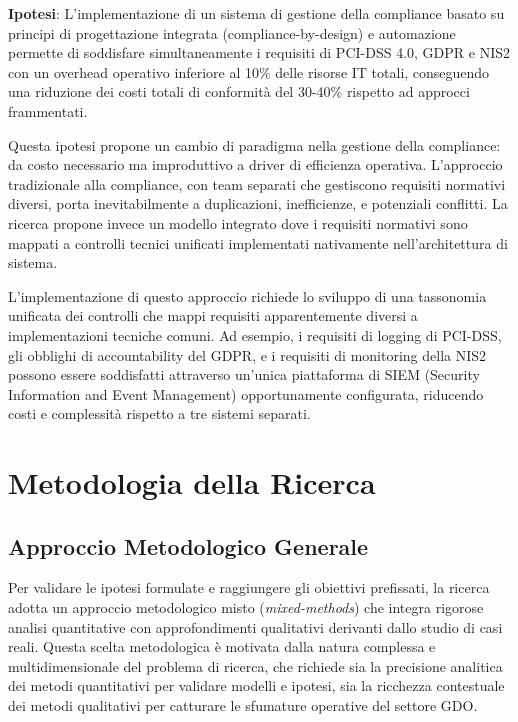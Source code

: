 \textbf{Ipotesi}: L'implementazione di un sistema di gestione della compliance basato su principi di progettazione integrata (compliance-by-design) e automazione permette di soddisfare simultaneamente i requisiti di PCI-DSS 4.0, GDPR e NIS2 con un overhead operativo inferiore al 10\% delle risorse IT totali, conseguendo una riduzione dei costi totali di conformità del 30-40\% rispetto ad approcci frammentati.

Questa ipotesi propone un cambio di paradigma nella gestione della compliance: da costo necessario ma improduttivo a driver di efficienza operativa. L'approccio tradizionale alla compliance, con team separati che gestiscono requisiti normativi diversi, porta inevitabilmente a duplicazioni, inefficienze, e potenziali conflitti. La ricerca propone invece un modello integrato dove i requisiti normativi sono mappati a controlli tecnici unificati implementati nativamente nell'architettura di sistema.

L'implementazione di questo approccio richiede lo sviluppo di una tassonomia unificata dei controlli che mappi requisiti apparentemente diversi a implementazioni tecniche comuni. Ad esempio, i requisiti di logging di PCI-DSS, gli obblighi di accountability del GDPR, e i requisiti di monitoring della NIS2 possono essere soddisfatti attraverso un'unica piattaforma di SIEM (Security Information and Event Management) opportunamente configurata, riducendo costi e complessità rispetto a tre sistemi separati.

\section{Metodologia della Ricerca}

\subsection{Approccio Metodologico Generale}

Per validare le ipotesi formulate e raggiungere gli obiettivi prefissati, la ricerca adotta un approccio metodologico misto (\textit{mixed-methods}) che integra rigorose analisi quantitative con approfondimenti qualitativi derivanti dallo studio di casi reali. Questa scelta metodologica è motivata dalla natura complessa e multidimensionale del problema di ricerca, che richiede sia la precisione analitica dei metodi quantitativi per validare modelli e ipotesi, sia la ricchezza contestuale dei metodi qualitativi per catturare le sfumature operative del settore GDO.

